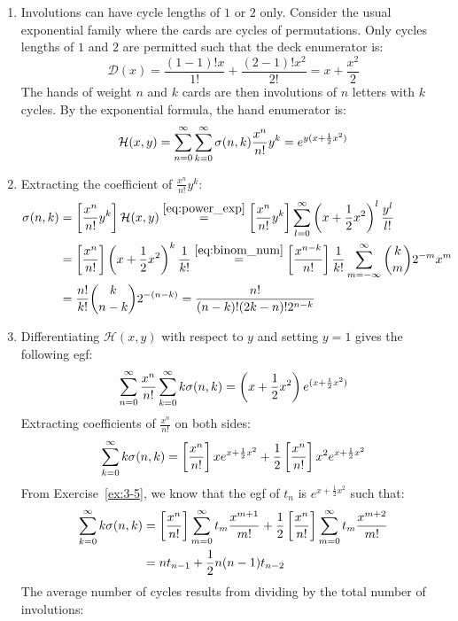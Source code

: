 \begin{solution}
    \begin{enumerate}[label=(\alph*)]
        \item Involutions can have cycle lengths of $1$ or $2$ only. Consider the usual exponential family where the cards are cycles of permutations. Only cycles lengths of $1$ and $2$ are permitted such that the deck enumerator is:
        \[
            \mathcal{D}(x) = \frac{(1-1)! x}{1!} + \frac{(2-1)!x^2}{2!} = x + \frac{x^2}{2}
        \]
        The hands of weight $n$ and $k$ cards are then involutions of $n$ letters with $k$ cycles. By the exponential formula, the hand enumerator is:
        \[
            \mathcal{H}(x,y) = \bsum[n]\bsum[k] \sigma(n,k) \frac{x^n}{n!} y^k = e^{y(x+\frac{1}{2}x^2)}
        \]
        \item Extracting the coefficient of $\frac{x^n}{n!}y^k$:
        \begin{align*}
            \sigma(n,k) &= \coeff{\frac{x^n}{n!}y^k} \mathcal{H}(x,y) \estep{\eqref{eq:power_exp}} \coeff{\frac{x^n}{n!}y^k} \bsum[l] \left(x+\frac{1}{2}x^2\right)^l \frac{y^l}{l!} \\
            &= \coeff{\frac{x^n}{n!}} \left(x+\frac{1}{2}x^2\right)^k\frac{1}{k!} \estep{\eqref{eq:binom_num}} \coeff{\frac{x^{n-k}}{n!}}\frac{1}{k!} \infsum[m] \binom{k}{m} 2^{-m}x^m  \\
            &= \frac{n!}{k!}\binom{k}{n-k} 2^{-(n-k)} = \frac{n!}{(n-k)!(2k-n)!2^{n-k}}
        \end{align*}
        \item Differentiating $\mathcal{H}(x,y)$ with respect to $y$ and setting $y=1$ gives the following egf:
        \[
            \bsum[n] \frac{x^n}{n!} \bsum[k] k\sigma(n,k) = \left(x+\frac{1}{2}x^2\right)e^{(x+\frac{1}{2}x^2)}
        \]
        Extracting coefficients of $\frac{x^n}{n!}$ on both sides:
        \[
            \bsum[k] k\sigma(n,k) = \coeff{\frac{x^n}{n!}} xe^{x+\frac{1}{2}x^2} + \frac{1}{2}\coeff{\frac{x^n}{n!}} x^2e^{x+\frac{1}{2}x^2}
        \]
        From Exercise~\ref{ex:3-5}, we know that the egf of $t_n$ is $e^{x+\frac{1}{2}x^2}$ such that:
        \begin{align*}
            \bsum[k] k\sigma(n,k) &= \coeff{\frac{x^n}{n!}} \bsum[m] t_m \frac{x^{m+1}}{m!} + \frac{1}{2}\coeff{\frac{x^n}{n!}} \bsum[m] t_m \frac{x^{m+2}}{m!} \\
            &= nt_{n-1} + \frac{1}{2}n(n-1)t_{n-2}
        \end{align*}
        The average number of cycles results from dividing by the total number of involutions:

\end{enumerate}
\end{solution}

